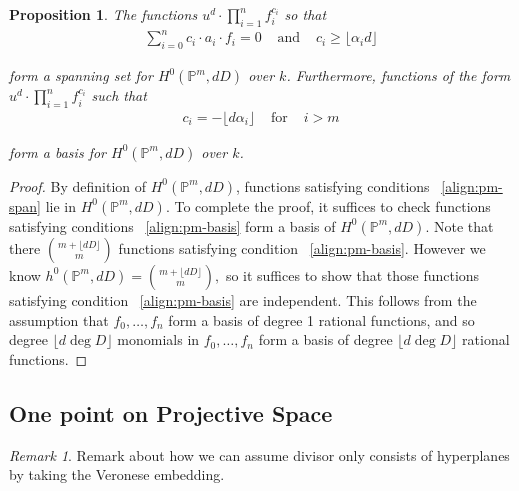 \documentclass{amsart}
\theoremstyle{plain}
\newtheorem{prop}[thm]{Proposition}
\theoremstyle{definition}
\theoremstyle{remark}
\newtheorem{rem}[thm]{Remark}
\numberwithin{equation}{section}
\newcommand\ssec{\subsection}
\newcommand\bp{{\mathbb P}}
\newcommand\bida{a}
\begin{document}
\begin{prop}
\label{prop:pm-span-and-basis}
The functions $u^d \cdot \prod_{i=1}^n f_i^{c_i}$ so that 
\begin{align}
\label{align:pm-span}
\sum_{i=0}^{n} c_i \cdot \bida_i \cdot f_i = 0 & \text{ and } &c_i \geq \lfloor \alpha_i d\rfloor	
\end{align}

\noindent
{}
form a spanning set for $H^0(\bp^m, dD)$ over $k$. Furthermore, functions 
of the form $u^d \cdot \prod_{i=1}^n f_i^{c_i} $ such that
\begin{align}
\label{align:pm-basis}
c_i = -\lfloor d\alpha_i \rfloor & \text{ for } & i > m
\end{align}

\noindent
form a basis for $H^0(\bp^m, dD)$ over $k$.
\end{prop}

\begin{proof}
By definition of $H^0(\bp^m,dD)$, functions satisfying conditions 
~\eqref{align:pm-span} lie in $H^0(\bp^m,dD)$. To complete the proof, it suffices to check functions satisfying conditions ~\eqref{align:pm-basis} form a basis of $H^0(\bp^m,dD)$. Note that there $\binom{m+ \lfloor dD \rfloor }{m}$ functions satisfying condition ~\eqref{align:pm-basis}. However we know $h^0(\bp^m,dD) = \binom{m+ \lfloor dD \rfloor }{m},$ so it suffices to show that those functions satisfying condition ~\eqref{align:pm-basis} are independent. This follows from the assumption that $f_0,\ldots, f_n$ form a basis of degree 1 rational functions, and so degree $\lfloor d \deg D \rfloor $ monomials in $f_0,\ldots, f_n$ form a basis of degree $\lfloor d \deg D \rfloor $ rational functions.
\end{proof}


\ssec{One point on Projective Space}
\label{ssec:proj-one-point}

\begin{rem}
Remark about how we can assume divisor only consists of hyperplanes
by taking the Veronese embedding.
\end{rem}
\end{document}
